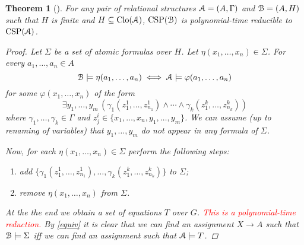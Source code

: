 \documentclass{amsart}
\theoremstyle{plain}
\newtheorem{theorem}{Theorem}[section]
\theoremstyle{definition}
\theoremstyle{remark}
\def\phi{\varphi}
\def\E{\exists}
\DeclareMathOperator{\Clo}{Clo}
\DeclareMathOperator{\CSP}{CSP}
\begin{document}
\begin{theorem}[\cite{jeavons}]
    For any pair of relational structures $\EuScript{A}=(A,\Gamma)$ 
    and $\EuScript{B}=(A, H)$ 
    such that $H$ is finite and $H \subseteq \Clo(\EuScript{A})$, $\CSP(\EuScript{B})$ is polynomial-time reducible to $\CSP(\EuScript{A})$.
    \begin{proof}
        Let $\Sigma$ be a set of atomic formulas over $H$.  
        Let $\eta(x_1, \ldots, x_n) \in \Sigma$. 
        For every $a_1, \ldots, a_n \in A$ 
        \begin{equation}
            \label{equiv}
            \EuScript{B} \models \eta(a_1, \ldots, a_n)  
            \iff \EuScript{A} \models \phi(a_1, \ldots, a_n)
        \end{equation}
        for some $\phi(x_1, \ldots, x_n)$ of the form 
        \begin{equation*}
            \E y_1, \ldots, y_m \,( \gamma_1(z^{1}_{1}, \ldots, z^{1}_{n_1}) \land \cdots \land \gamma_k(z^{k}_{1}, \ldots, z^{k}_{n_k}))
        \end{equation*} 
        where $\gamma_1, \ldots, \gamma_k \in \Gamma$ and $z^{i}_{j} \in \{x_1, \ldots, x_n, y_1, \ldots, y_m\}$.
        We can assume (up to renaming of variables) that $y_1, \ldots, y_m$ do not appear in any formula of $\Sigma$.  

        Now, for each $\eta(x_1, \ldots, x_n) \in \Sigma$ perform the following steps: 
        \begin{enumerate}
            \item add $\{\gamma_1(z^{1}_{1}, \ldots, z^{1}_{n_1}), \ldots, \gamma_k(z^{k}_{1}, \ldots, z^{k}_{n_k})\}$ to $\Sigma$; 
            \item remove $\eta(x_1, \ldots, x_n)$ from $\Sigma$. 
        \end{enumerate}
        At the the end we obtain a set of equations $T$ over $G$. 
        \textcolor{red}{This is a polynomial-time reduction. 
        } 
        By \eqref{equiv} it is clear that we can find an assignment $X \to A$ such that $\EuScript{B} \models \Sigma$ iff we can find an assignment such that $\EuScript{A} \models T$.
    \end{proof} 
\end{theorem}
\end{document}
